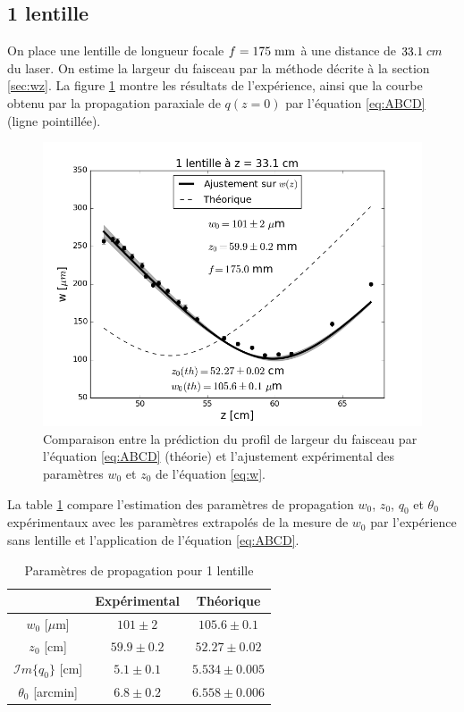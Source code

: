 \documentclass[10pt,letterpaper,twocolumn]{article}
\newcommand{\s}{\hspace{0.1cm}}
\begin{document}
\subsection{1 lentille}
On place une lentille de longueur focale $f=175\s \text{mm}$ à une distance de $33.1\s {cm}$ du laser. On estime la largeur du faisceau par la méthode décrite à la section \ref{sec:wz}. La figure \ref{fig:w2} montre les résultats de l'expérience, ainsi que la courbe obtenu par la propagation paraxiale de $q(z=0)$ par l'équation \eqref{eq:ABCD} (ligne pointillée). 
\begin{figure}[H]
	\centering
	\includegraphics[width=\linewidth]{figures/w2.png}
	\caption{Comparaison entre la prédiction du profil de largeur du faisceau par l'équation \eqref{eq:ABCD} (théorie) et l'ajustement expérimental des paramètres $w_0$ et $z_0$ de l'équation \eqref{eq:w}. }
	\label{fig:w2}
\end{figure}
La table \ref{tab:w2} compare l'estimation des paramètres de propagation $w_0$, $z_0$, $q_0$ et $\theta_0$ expérimentaux avec les paramètres extrapolés de la mesure de $w_0$ par l'expérience sans lentille et l'application de l'équation \eqref{eq:ABCD}. 
\begin{table}[H]
	\centering
	\caption{Paramètres de propagation pour 1 lentille}
	\label{tab:w2}
	\begin{tabular}{|c|c|c|}
		\hline
			&Expérimental & Théorique \\\hline
		  $w_0$ [$\mu$m] & $101 \pm 2$& $105.6 \pm 0.1$ \\\hline
		  $z_0$ [cm] & $59.9 \pm 0.2$  & $52.27 \pm 0.02$ \\\hline
		  $\mathcal{I}m\{q_0\}$ [cm]  & $5.1 \pm 0.1$  & $5.534 \pm 0.005$ \\\hline
		  $\theta_0$ [arcmin]& $6.8 \pm 0.2$ & $6.558 \pm 0.006$ \\\hline
	\end{tabular}
\end{table}
\end{document}
